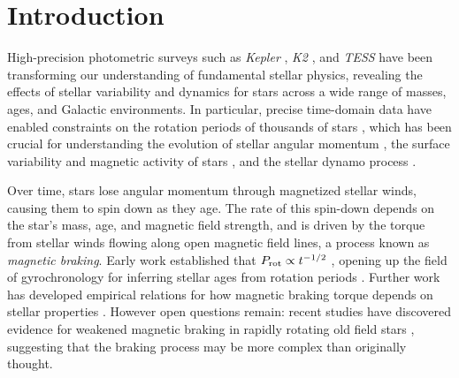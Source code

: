 \documentclass[preprint]{aastex702}
\begin{document}
\section{Introduction} \label{sec:introduction}

High-precision photometric surveys such as \emph{Kepler} \citep{borucki_kepler_2010}, \emph{K2} \citep{howell_k2_2014}, and \emph{TESS} \citep{ricker_transiting_2014} have been transforming our understanding of fundamental stellar physics, revealing the effects of stellar variability and dynamics for stars across a wide range of masses, ages, and Galactic environments. In particular, precise time-domain data have enabled constraints on the rotation periods of thousands of stars \citep{mcquillan_rotation_2014,gordon_stellar_2021,boyle_tess_rotation_2026}, which has been crucial for understanding the evolution of stellar angular momentum \citep{weber_angular_1967,skumanich_time_1972}, the surface variability and magnetic activity of stars \citep{santos_starspot_2017,forgacs-dajka_time-dependent_2021}, and the stellar dynamo process \citep{brun_differential_2017,kapyla_simulations_2023,noraz_impact_2022}.

Over time, stars lose angular momentum through magnetized stellar winds, causing them to spin down as they age. The rate of this spin-down depends on the star's mass, age, and magnetic field strength, and is driven by the torque from stellar winds flowing along open magnetic field lines, a process known as \emph{magnetic braking}. Early work established that $P_{\rm rot} \propto t^{-1/2}$ \citep{skumanich_time_1972}, opening up the field of gyrochronology for inferring stellar ages from rotation periods \citep{barnes_rotational_2003,barnes_ages_2007}. Further work has developed empirical relations for how magnetic braking torque depends on stellar properties \citep{kawaler_angular_1988,sills_angular_2000,reiners_radius-dependent_2012,vansaders_fast_2013,matt_mass-dependence_2015,amard_impact_2020,ireland_effect_2021}. However open questions remain: recent studies have discovered evidence for weakened magnetic braking in rapidly rotating old field stars \citep{van_saders_weakened_2016,saunders_stellar_2024}, suggesting that the braking process may be more complex than originally thought.
\end{document}
